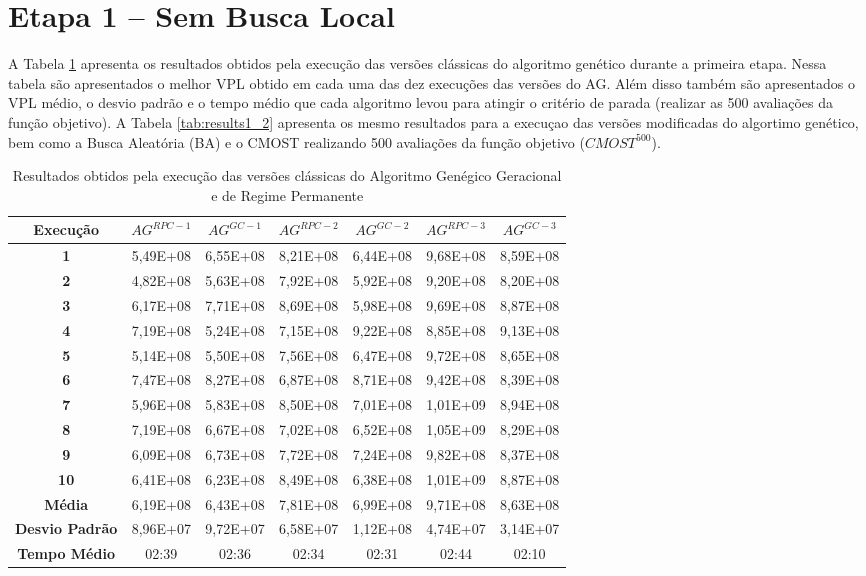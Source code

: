 \section{Etapa 1 – Sem Busca Local}
\label{ch:5_Etapa1}
A Tabela \ref{tab:results1_1} apresenta os resultados obtidos pela execução das versões clássicas do algoritmo genético durante a primeira etapa. Nessa tabela são apresentados o melhor VPL obtido em cada uma das dez execuções das versões do AG. Além disso também são apresentados o VPL médio, o desvio padrão e o tempo médio que cada algoritmo levou para atingir o critério de parada (realizar as 500 avaliações da função objetivo). A Tabela \ref{tab:results1_2} apresenta os mesmo resultados para a execuçao das versões modificadas do algortimo genético, bem como a Busca Aleatória (BA) e o CMOST realizando 500 avaliações da função objetivo ($CMOST^{500}$).

\begin{table}[H]
\centering
\caption{Resultados obtidos pela execução das versões clássicas do Algoritmo Genégico Geracional e de Regime Permanente}
\label{tab:results1_1}
\begin{tabular}{|c|c|c|c|c|c|c|}
\hline
\textbf{Execução} & $AG^{RPC-1}$ & $AG^{GC-1}$ & $AG^{RPC-2}$ & $AG^{GC-2}$ & $AG^{RPC-3}$ & $AG^{GC-3}$ \\ \hline
\textbf{1} & 5,49E+08 & 6,55E+08 & 8,21E+08 & 6,44E+08 & 9,68E+08 & 8,59E+08 \\ \hline
\textbf{2} & 4,82E+08 & 5,63E+08 & 7,92E+08 & 5,92E+08 & 9,20E+08 & 8,20E+08 \\ \hline
\textbf{3} & 6,17E+08 & 7,71E+08 & 8,69E+08 & 5,98E+08 & 9,69E+08 & 8,87E+08 \\ \hline
\textbf{4} & 7,19E+08 & 5,24E+08 & 7,15E+08 & 9,22E+08 & 8,85E+08 & 9,13E+08 \\ \hline
\textbf{5} & 5,14E+08 & 5,50E+08 & 7,56E+08 & 6,47E+08 & 9,72E+08 & 8,65E+08 \\ \hline
\textbf{6} & 7,47E+08 & 8,27E+08 & 6,87E+08 & 8,71E+08 & 9,42E+08 & 8,39E+08 \\ \hline
\textbf{7} & 5,96E+08 & 5,83E+08 & 8,50E+08 & 7,01E+08 & 1,01E+09 & 8,94E+08 \\ \hline
\textbf{8} & 7,19E+08 & 6,67E+08 & 7,02E+08 & 6,52E+08 & 1,05E+09 & 8,29E+08 \\ \hline
\textbf{9} & 6,09E+08 & 6,73E+08 & 7,72E+08 & 7,24E+08 & 9,82E+08 & 8,37E+08 \\ \hline
\textbf{10} & 6,41E+08 & 6,23E+08 & 8,49E+08 & 6,38E+08 & 1,01E+09 & 8,87E+08 \\ \hline

\textbf{Média} & 6,19E+08 & 6,43E+08 & 7,81E+08 & 6,99E+08 & 9,71E+08 & 8,63E+08 \\ \hline
\textbf{Desvio Padrão} & 8,96E+07 & 9,72E+07 & 6,58E+07 & 1,12E+08 & 4,74E+07 & 3,14E+07 \\ \hline
\textbf{Tempo Médio} & 02:39 & 02:36 & 02:34 & 02:31 & 02:44 & 02:10 \\ \hline
\end{tabular}
\end{table}

